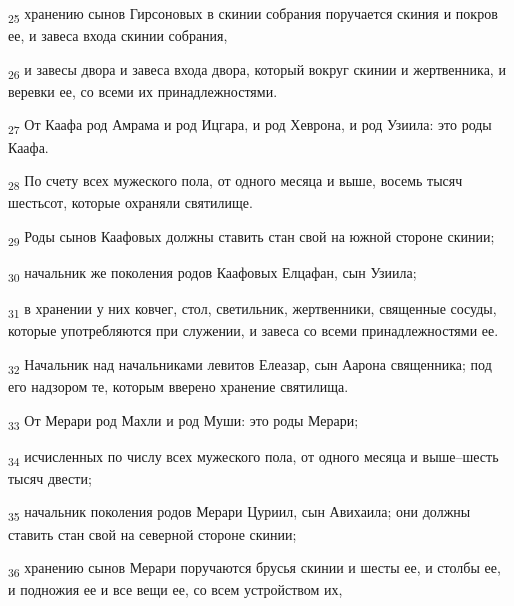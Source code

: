 \begin{tcolorbox}
\textsubscript{25} хранению сынов Гирсоновых в скинии собрания поручается скиния и покров ее, и завеса входа скинии собрания,
\end{tcolorbox}
\begin{tcolorbox}
\textsubscript{26} и завесы двора и завеса входа двора, который вокруг скинии и жертвенника, и веревки ее, со всеми их принадлежностями.
\end{tcolorbox}
\begin{tcolorbox}
\textsubscript{27} От Каафа род Амрама и род Ицгара, и род Хеврона, и род Узиила: это роды Каафа.
\end{tcolorbox}
\begin{tcolorbox}
\textsubscript{28} По счету всех мужеского пола, от одного месяца и выше, восемь тысяч шестьсот, которые охраняли святилище.
\end{tcolorbox}
\begin{tcolorbox}
\textsubscript{29} Роды сынов Каафовых должны ставить стан свой на южной стороне скинии;
\end{tcolorbox}
\begin{tcolorbox}
\textsubscript{30} начальник же поколения родов Каафовых Елцафан, сын Узиила;
\end{tcolorbox}
\begin{tcolorbox}
\textsubscript{31} в хранении у них ковчег, стол, светильник, жертвенники, священные сосуды, которые употребляются при служении, и завеса со всеми принадлежностями ее.
\end{tcolorbox}
\begin{tcolorbox}
\textsubscript{32} Начальник над начальниками левитов Елеазар, сын Аарона священника; под его надзором те, которым вверено хранение святилища.
\end{tcolorbox}
\begin{tcolorbox}
\textsubscript{33} От Мерари род Махли и род Муши: это роды Мерари;
\end{tcolorbox}
\begin{tcolorbox}
\textsubscript{34} исчисленных по числу всех мужеского пола, от одного месяца и выше--шесть тысяч двести;
\end{tcolorbox}
\begin{tcolorbox}
\textsubscript{35} начальник поколения родов Мерари Цуриил, сын Авихаила; они должны ставить стан свой на северной стороне скинии;
\end{tcolorbox}
\begin{tcolorbox}
\textsubscript{36} хранению сынов Мерари поручаются брусья скинии и шесты ее, и столбы ее, и подножия ее и все вещи ее, со всем устройством их,
\end{tcolorbox}
